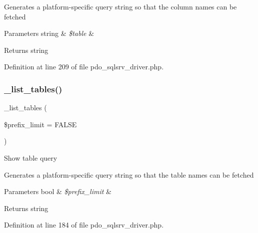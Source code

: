 Generates a platform-\/specific query string so that the column names can be fetched


\begin{DoxyParams}[1]{Parameters}
string & {\em \$table} & \\
\hline
\end{DoxyParams}
\begin{DoxyReturn}{Returns}
string 
\end{DoxyReturn}


Definition at line 209 of file pdo\+\_\+sqlsrv\+\_\+driver.\+php.

\mbox{\label{class_c_i___d_b__pdo__sqlsrv__driver_a435c0f3ce54fe7daa178baa8532ebd54}} 
\subsubsection{\texorpdfstring{\_list\_tables()}{\_list\_tables()}}
{\footnotesize\ttfamily \+\_\+list\+\_\+tables (\begin{DoxyParamCaption}\item[{}]{\$prefix\+\_\+limit = {\ttfamily FALSE} }\end{DoxyParamCaption})\hspace{0.3cm}{\ttfamily [protected]}}

Show table query

Generates a platform-\/specific query string so that the table names can be fetched


\begin{DoxyParams}[1]{Parameters}
bool & {\em \$prefix\+\_\+limit} & \\
\hline
\end{DoxyParams}
\begin{DoxyReturn}{Returns}
string 
\end{DoxyReturn}


Definition at line 184 of file pdo\+\_\+sqlsrv\+\_\+driver.\+php.

\mbox{\label{class_c_i___d_b__pdo__sqlsrv__driver_a2540b03a93fa73ae74c10d0e16fc073e}} 
